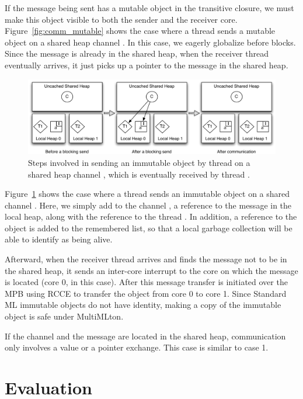 If the message being sent has a mutable object in the transitive closure, we
must make this object visible to both the sender and the receiver core.
Figure~\ref{fig:comm_mutable} shows the case where a thread  sends a
mutable object  on a shared heap channel . In this case, we eagerly
globalize  before  blocks. Since the message is already in the
shared heap, when the receiver thread  eventually arrives, it just picks
up a pointer to the message in the shared heap.

\begin{figure}
\centering
\includegraphics[width=1\textwidth]{Figures/Comm_Case_4}
\caption{Steps involved in sending an immutable object  by thread 
on a shared heap channel , which is eventually received by thread
.}
\label{fig:comm_immutable}
\end{figure}

Figure~\ref{fig:comm_immutable} shows the case where a thread  sends an
immutable object  on a shared channel . Here, we simply add to the
channel , a reference to the message  in the local heap, along with
the reference to the thread . In addition, a reference to the object
 is added to the remembered list, so that a local garbage collection will
be able to identify  as being alive.

Afterward, when the receiver thread  arrives and finds the message not to
be in the shared heap, it sends an inter-core interrupt to the core on which the
message is located (core 0, in this case). After this message transfer is
initiated over the MPB using RCCE to transfer the object  from core 0 to
core 1. Since Standard ML immutable objects do not have identity, making a copy
of the immutable object is safe under MultiMLton.

If the channel and the message are located in the shared heap, communication
only involves a value or a pointer exchange. This case is similar to case 1.

\section{Evaluation}
\label{sec:gc_bench}

